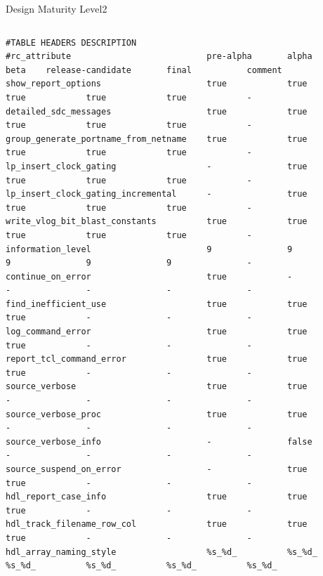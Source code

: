 \documentclass{beamer}
\begin{document}
\begin{frame}[fragile,plain,label=rc_attributes]{Design Maturity Level}{2}
\begin{columns}
\begin{column}{1.1\textwidth}
\tiny
\begin{verbatim}
#TABLE HEADERS DESCRIPTION
#rc_attribute                           pre-alpha       alpha           beta    release-candidate       final           comment
show_report_options                     true            true            true            true            true            -
detailed_sdc_messages                   true            true            true            true            true            -
group_generate_portname_from_netname    true            true            true            true            true            -
lp_insert_clock_gating                  -               true            true            true            true            -
lp_insert_clock_gating_incremental      -               true            true            true            true            -
write_vlog_bit_blast_constants          true            true            true            true            true            -
information_level                       9               9               9               9               9               -
continue_on_error                       true            -               -               -               -               -
find_inefficient_use                    true            true            true            -               -               -
log_command_error                       true            true            true            -               -               -
report_tcl_command_error                true            true            true            -               -               -
source_verbose                          true            true            -               -               -               -
source_verbose_proc                     true            true            -               -               -               -
source_verbose_info                     -               false           -               -               -               -
source_suspend_on_error                 -               true            true            -               -               -
hdl_report_case_info                    true            true            true            -               -               -
hdl_track_filename_row_col              true            true            true            -               -               -
hdl_array_naming_style                  %s_%d_          %s_%d_          %s_%d_          %s_%d_          %s_%d_          %s_%d_

\end{verbatim}
\end{column}
\end{columns}
\end{frame}
\end{document}
